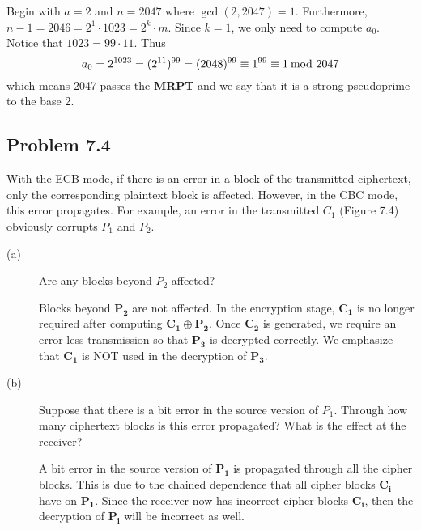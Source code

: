 \documentclass[../hw_sols.tex]{subfiles}
\begin{document}
\begin{solution}
Begin with $a = 2$ and $n = 2047$ where $\gcd(2,2047) = 1$. Furthermore, 
$n-1 = 2046 = 2^1 \cdot 1023 = 2^k \cdot m$. Since $k=1$, we only need to 
compute $a_0$. Notice that $1023 = 99 \cdot 11$. Thus
	$$a_0 = 2^{1023} = (2^{11})^{99} = (2048)^{99} 
	\equiv 1^{99} 
	\equiv 1 \tmod{2047}$$
which means 2047 passes the \textbf{MRPT} and we say that it is a strong 
pseudoprime to the base 2.
\end{solution}


\newpage


\subsection*{Problem 7.4}

With the ECB mode, if there is an error in a block of the transmitted 
ciphertext, only the corresponding plaintext block is affected. However, in 
the CBC mode, this error propagates. For example, an error in the transmitted 
$C_1$ (Figure 7.4) obviously corrupts $P_1$ and $P_2$.

\begin{description}

\item[(a)] Are any blocks beyond $P_2$ affected?

\begin{solution}
Blocks beyond $\mathbf{P_2}$ are not affected. In the encryption stage, 
$\mathbf{C_1}$ is no longer required after computing 
$\mathbf{C_1} \oplus \mathbf{P_2}$. Once $\mathbf{C_2}$ is generated, we 
require an error-less transmission so that $\mathbf{P_3}$ is decrypted 
correctly. We emphasize that $\mathbf{C_1}$ is NOT used in the decryption of 
$\mathbf{P_3}$.
\end{solution}

\item[(b)] Suppose that there is a bit error in the source version of $P_1$. 
Through how many ciphertext blocks is this error propagated? What is the 
effect at the receiver?

\begin{solution}
A bit error in the source version of $\mathbf{P_1}$ is propagated through all 
the cipher blocks. This is due to the chained dependence that all cipher 
blocks $\mathbf{C_i}$ have on $\mathbf{P_1}$. Since the receiver now has 
incorrect cipher blocks $\mathbf{C_i}$, then the decryption of $\mathbf{P_i}$ 
will be incorrect as well.
\end{solution}

\end{description}
\end{document}
